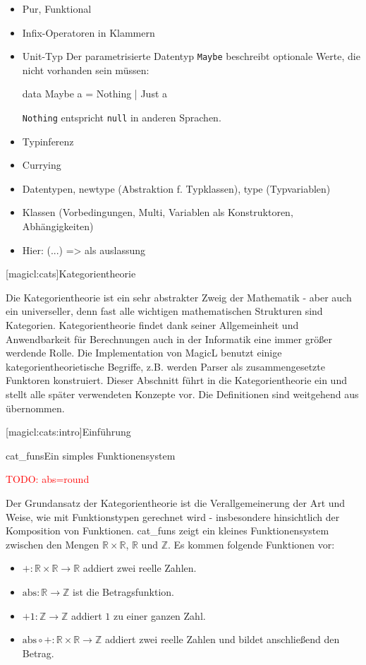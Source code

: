 \documentclass[a4paper, bibgerm]{book}
\newcommand\icode[1]{\lstinline?#1?}
\newcommand{\todo}[1]{
  \textcolor{red}{TODO: #1}
}
\newcommand\lsection{}
\newcommand\lsubsection{}
\newcommand\abb{}
\newcommand\fig{}
\newcommand\ato{\rightarrow} %
\begin{document}
\begin{itemize}
\item Pur, Funktional
\item Infix-Operatoren in Klammern
\item Unit-Typ
Der parametrisierte Datentyp \icode{Maybe} beschreibt optionale Werte,
die nicht vorhanden sein müssen:

\begin{code}
data Maybe a = Nothing | Just a
\end{code}

\icode{Nothing} entspricht \icode{null} in anderen Sprachen.
\item Typinferenz
\item Currying
\item Datentypen, newtype (Abstraktion f. Typklassen), type (Typvariablen)
\item Klassen (Vorbedingungen, Multi, Variablen als Konstruktoren, Abhängigkeiten)
\item Hier: (...) => als auslassung
\end{itemize}

\lsection[magicl:cats]{Kategorientheorie}

Die Kategorientheorie ist ein sehr abstrakter Zweig der Mathematik -
aber auch ein universeller, denn fast alle wichtigen mathematischen
Strukturen sind Kategorien. Kategorientheorie findet dank seiner
Allgemeinheit und Anwendbarkeit für Berechnungen auch in der Informatik
eine immer größer werdende Rolle. Die Implementation von MagicL benutzt
einige kategorientheorietische Begriffe, z.B. werden Parser als
zusammengesetzte Funktoren konstruiert. Dieser Abschnitt führt in die
Kategorientheorie ein und stellt alle später verwendeten Konzepte
vor. Die Definitionen sind weitgehend aus \cite{Grundlagen} übernommen.

\lsubsection[magicl:cats:intro]{Einführung}

\fig{cat_funs}{Ein simples Funktionensystem}

\todo{abs=round}

Der Grundansatz der Kategorientheorie ist die Verallgemeinerung der
Art und Weise, wie mit Funktionstypen gerechnet wird - insbesondere
hinsichtlich der Komposition von Funktionen. \abb{cat_funs} zeigt ein
kleines Funktionensystem zwischen den Mengen $\mathbb{R} \times
\mathbb{R}$, $\mathbb{R}$ und $\mathbb{Z}$. Es kommen folgende
Funktionen vor:
\begin{itemize}
\item $+ : \mathbb{R} \times \mathbb{R} \ato \mathbb{R}$ addiert zwei
  reelle Zahlen.
\item $\mathrm{abs} : \mathbb{R} \ato \mathbb{Z}$ ist die Betragsfunktion.
\item $+1 : \mathbb{Z} \ato \mathbb{Z}$ addiert $1$ zu einer ganzen Zahl.
\item $\mathrm{abs} \circ + : \mathbb{R} \times \mathbb{R} \ato \mathbb{Z}$
  addiert zwei reelle Zahlen und bildet anschließend den Betrag.
\end{itemize}
\end{document}

